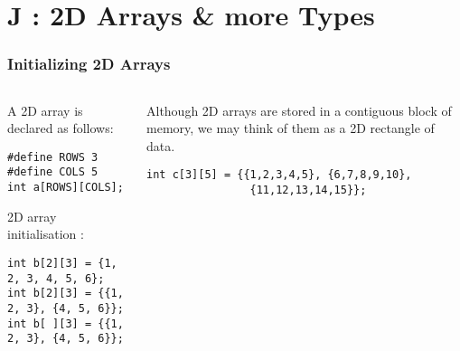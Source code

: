 \section{J : 2D Arrays \& more Types}
\label{chap:2darrs}

\begin{frame}[fragile]
\frametitle{Initializing 2D Arrays}
\begin{columns}

\begin{column}{0.45\textwidth}
A 2D array is declared as follows:
\begin{verbatim}
#define ROWS 3
#define COLS 5
int a[ROWS][COLS];
\end{verbatim}
 2D array initialisation :
\begin{verbatim}
int b[2][3] = {1, 2, 3, 4, 5, 6};
int b[2][3] = {{1, 2, 3}, {4, 5, 6}};
int b[ ][3] = {{1, 2, 3}, {4, 5, 6}};
\end{verbatim}
\end{column}

\pause
\begin{column}{0.45\textwidth}
Although 2D arrays are stored in a contiguous block of memory,
we may think of them as a 2D rectangle of data.
\begin{verbatim}
int c[3][5] = {{1,2,3,4,5}, {6,7,8,9,10},
                {11,12,13,14,15}};
\end{verbatim}
\begin{center}
\begin{figure}[h]
\end{figure}
\end{center}
\end{column}

\end{columns}
\end{frame}

